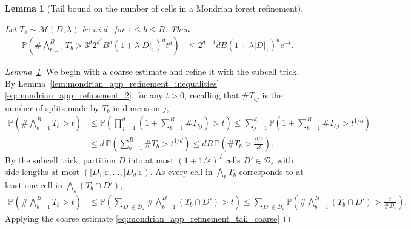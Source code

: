 \documentclass[11pt,lof]{puthesis}
\renewcommand{\P}{\ensuremath{\mathbb{P}}}
\newcommand{\cM}{\ensuremath{\mathcal{M}}}
\newcommand{\cD}{\ensuremath{\mathcal{D}}}
\theoremstyle{break}
\newtheorem{lemma}{Lemma}[section]
\theoremstyle{proof}
\newtheorem{proof}{Proof}
\begin{document}
\begin{lemma}[Tail bound on the number of cells in a Mondrian forest refinement]
  \label{lem:mondrian_app_refinement_tail}

  Let $T_b \sim \cM(D, \lambda)$ be i.i.d.\ for $1 \leq b \leq B$. Then
  \begin{align*}
    \P\left(
      \# \bigwedge_{b=1}^B T_b
      > 3^d 2^{d^2} B^d (1+\lambda|D|_1)^d t^d
    \right)
    &\leq
    2^{d+1} d B (1 + \lambda |D|_1)^d e^{-t}.
  \end{align*}

\end{lemma}

\begin{proof}[Lemma~\ref{lem:mondrian_app_refinement_tail}]

  We begin with a coarse estimate and refine it with the subcell trick.
  By Lemma~\ref{lem:mondrian_app_refinement_inequalities}
  \eqref{eq:mondrian_app_refinement_2},
  for any $t > 0$, recalling that $\# T_{b j}$ is the number
  of splits made by $T_b$ in dimension $j$,
  \begin{align}
    \nonumber
    \P\left(
      \# \bigwedge_{b=1}^B T_b
      > t
    \right)
    &\leq
    \P\left(
      \prod_{j=1}^d
      \left(
        1 + \sum_{b=1}^B \# T_{b j}
      \right)
      > t
    \right)
    \leq
    \sum_{j=1}^d
    \P\left(
      1 + \sum_{b=1}^B \# T_{b j}
      > t^{1/d}
    \right) \\
    \label{eq:mondrian_app_refinement_tail_coarse}
    &\leq
    d\, \P\left(
      \sum_{b=1}^B \# T_b
      > t^{1/d}
    \right)
    \leq
    d B\,
    \P\left(
      \# T_b > \frac{t^{1/d}}{B}
    \right).
  \end{align}
  By the subcell trick, partition $D$ into
  at most $(1 + 1/\varepsilon)^d$ cells
  $D' \in \cD_\varepsilon$ with side lengths at most
  $(|D_1| \varepsilon, \ldots, |D_d| \varepsilon)$.
  As every cell in $\bigwedge_b T_b$ corresponds to
  at least one cell in $\bigwedge_b (T_b \cap D')$,
  \begin{align*}
    \P\left(
      \# \bigwedge_{b=1}^B T_b
      > t
    \right)
    &\leq
    \P\left(
      \sum_{D' \in \cD_\varepsilon}
      \# \bigwedge_{b=1}^B (T_b \cap D')
      > t
    \right)
    \leq
    \sum_{D' \in \cD_\varepsilon}
    \P\left(
      \# \bigwedge_{b=1}^B (T_b \cap D')
      > \frac{t}{\# \cD_\varepsilon}
    \right).
  \end{align*}
  Applying the coarse estimate \eqref{eq:mondrian_app_refinement_tail_coarse}

\end{proof}
\end{document}
